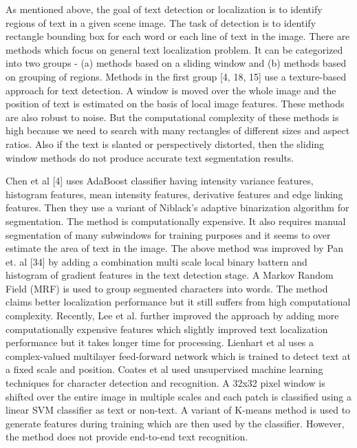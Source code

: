 As mentioned above, the goal of text detection or localization is to identify regions
of text in a given scene image. The task of detection is 
to identify rectangle bounding box for each word or each line of text in the image.
There are methods which focus on general text localization problem.
It can be categorized into
two groups - (a) methods based on a sliding window and (b) methods based
on grouping of regions. 
Methods in the first group \cite{chap2-1, chap2-2, chap2-3}[4, 18, 15]
use a texture-based approach for text detection. A window is moved over the whole image and the position of text is
estimated on the basis of local image features. 
These methods are also robust to noise.
But the computational complexity of these methods
is high because we need to search with many rectangles of different sizes and
aspect ratios. Also if the text is slanted or
perspectively distorted, then the sliding window methods do not produce
accurate text segmentation results.

Chen et al \cite{chap2-1}[4] uses AdaBoost classifier having intensity variance features, histogram features,
mean intensity features, derivative features and edge linking features. 
Then they use a variant of Niblack's adaptive binarization algorithm for segmentation. 
The method is
computationally expensive. It also
requires manual segmentation of many subwindows for training purposes and it seems
to over estimate the area of text in the image.
The above method was improved by Pan et. al \cite{chap2-2}[34] by adding a combination 
multi scale local binary battern and histogram of gradient
features in the text detection stage. A Markov Random Field
(MRF) is used to group segmented characters into words. The method claims better localization
performance but it still suffers from high computational complexity.
Recently, Lee et al. \cite{chap2-3} further improved the approach by adding
more computationally expensive features which slightly improved text localization performance
but it takes longer time for processing.
Lienhart et al \cite{chap2-4} uses a complex-valued multilayer feed-forward network 
which is trained to detect text at a fixed scale and position.
Coates et al \cite{chap2-5} used unsupervised machine learning techniques
for character detection and recognition. A 32x32 pixel window is
shifted over the entire image in multiple scales and each patch is classified using a
linear SVM classifier as text or non-text. A variant of K-means method is used 
to generate features during training which are then used by the classifier.
However, the method does not provide end-to-end text recognition.

